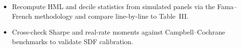 \documentclass[11pt,a4paper]{article}
\numberwithin{equation}{section}
\begin{document}
\begin{diagnosticbox}[title={Verification Paths}]
\begin{itemize}
  \item Recompute HML and decile statistics from simulated panels via the Fama--French methodology and compare line-by-line to Table~III.
  \item Cross-check Sharpe and real-rate moments against Campbell--Cochrane benchmarks to validate SDF calibration.
\end{itemize}
\end{diagnosticbox}
\end{document}
